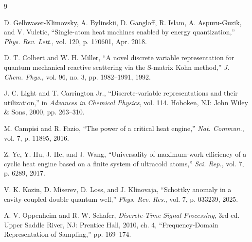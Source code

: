 \documentclass[10pt,conference]{IEEEtran}
\begin{document}
\begin{thebibliography}{9}

D. Gelbwaser-Klimovsky, A. Bylinskii, D. Gangloff, R. Islam, A. Aspuru-Guzik, and V. Vuletic, ``Single-atom heat machines enabled by energy quantization,'' \emph{Phys. Rev. Lett.}, vol. 120, p. 170601, Apr. 2018.

D. T. Colbert and W. H. Miller, ``A novel discrete variable representation for quantum mechanical reactive scattering via the S-matrix Kohn method,'' \emph{J. Chem. Phys.}, vol. 96, no. 3, pp. 1982--1991, 1992.

J. C. Light and T. Carrington Jr., ``Discrete-variable representations and their utilization,'' in \emph{Advances in Chemical Physics}, vol. 114. Hoboken, NJ: John Wiley \& Sons, 2000, pp. 263--310.

M. Campisi and R. Fazio, ``The power of a critical heat engine,'' \emph{Nat. Commun.}, vol. 7, p. 11895, 2016.

Z. Ye, Y. Hu, J. He, and J. Wang, ``Universality of maximum-work efficiency of a cyclic heat engine based on a finite system of ultracold atoms,'' \emph{Sci. Rep.}, vol. 7, p. 6289, 2017.

V. K. Kozin, D. Miserev, D. Loss, and J. Klinovaja, ``Schottky anomaly in a cavity-coupled double quantum well,'' \emph{Phys. Rev. Res.}, vol. 7, p. 033239, 2025.

A. V. Oppenheim and R. W. Schafer, \emph{Discrete-Time Signal Processing}, 3rd ed. Upper Saddle River, NJ: Prentice Hall, 2010, ch. 4, ``Frequency-Domain Representation of Sampling,'' pp. 169--174.

\end{thebibliography}
\end{document}
